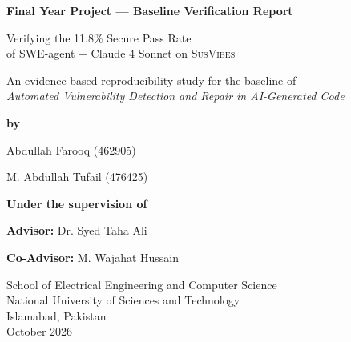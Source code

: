 \documentclass[11pt,a4paper]{article}
\newcommand{\SV}{\textsc{SusVibes}}
\begin{document}
\begin{titlepage}
\centering
\vspace*{1.2cm}
{\bfseries Final Year Project --- Baseline Verification Report\par}
\vspace{2.6cm}
{\LARGE Verifying the 11.8\% Secure Pass Rate\\[4pt] of SWE-agent + Claude 4 Sonnet on \SV\par}
\vspace{0.8cm}
{\large An evidence-based reproducibility study for the baseline of\\
\emph{Automated Vulnerability Detection and Repair in AI-Generated Code}\par}
\vspace{2.4cm}
{\large\bfseries by\par}
\vspace{0.8cm}
{\large Abdullah Farooq (462905)\par}
\vspace{0.3cm}
{\large M. Abdullah Tufail (476425)\par}
\vspace{2.0cm}
{\large\bfseries Under the supervision of\par}
\vspace{0.6cm}
{\large\textbf{Advisor:} Dr. Syed Taha Ali\par}
\vspace{0.3cm}
{\large\textbf{Co-Advisor:} M. Wajahat Hussain\par}
\vfill
School of Electrical Engineering and Computer Science\\
National University of Sciences and Technology\\
Islamabad, Pakistan\\
October 2026
\end{titlepage}

\setcounter{page}{1}
\tableofcontents
\newpage
\listoffigures
\newpage
\listoftables
\lstlistoflistings
\newpage

\end{document}
